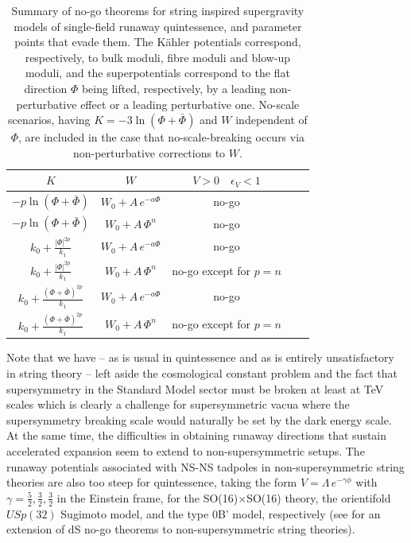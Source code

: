 \begin{table}[ht]
\begin{center}
\centering
\begin{tabular}{| c | c | c | c | c |}
\hline
{\cellcolor[gray]{0.9}$K$} & {\cellcolor[gray]{0.9}$W$} & {\cellcolor[gray]{0.9}$V>0 \quad \epsilon_V<1$} \\
\hline
\hline
$-p\ln(\Phi+\bar{\Phi})$ & $W_0 + A\,e^{-a\Phi}$ & no-go \\
\hline
$-p\ln(\Phi+\bar{\Phi})$ & $W_0 + A\,\Phi^n$ & no-go \\
\hline
$k_0 + \frac{|\Phi|^{2p}}{k_1}$ & $W_0 + A\,e^{-a\Phi}$  & no-go \\
\hline
$k_0 + \frac{|\Phi|^{2p}}{k_1}$ & $W_0 + A\,\Phi^n$ & no-go except for $p=n$ \\
\hline
$k_0 + \frac{(\Phi+\bar{\Phi})^{2p}}{k_1}$ & $W_0 + A\,e^{-a\Phi}$  & no-go \\
\hline
$k_0 + \frac{(\Phi+\bar{\Phi})^{2p}}{k_1}$ & $W_0 + A\,\Phi^n$ & no-go except for $p=n$ \\
\hline
\end{tabular}
\end{center} 
\caption{Summary of no-go theorems for string inspired supergravity models of single-field runaway quintessence, and parameter points that evade them. The K\"ahler potentials correspond, respectively, to bulk moduli, fibre moduli and blow-up moduli, and the superpotentials correspond to the flat direction $\Phi$ being lifted, respectively, by a leading non-perturbative effect or a leading perturbative one.  No-scale scenarios, having $K=-3\ln(\Phi + \bar{\Phi})$ and $W$ independent of $\Phi$, are included in the case that no-scale-breaking occurs via non-perturbative corrections to $W$.}  
\label{quintrunnogos}
\end{table}  

Note that we have -- as is usual in quintessence and as is entirely unsatisfactory in string theory -- left aside the cosmological constant problem and the fact that supersymmetry in the Standard Model sector must be broken at least at TeV scales which is clearly a challenge for supersymmetric vacua where the supersymmetry breaking scale would naturally be set by the dark energy scale.  At the same time, the difficulties in obtaining runaway directions that sustain accelerated expansion seem to extend to non-supersymmetric setups. The runaway potentials 
associated with NS-NS tadpoles in non-supersymmetric string theories are also too steep for quintessence, taking the form $V=\Lambda\, e^{-\gamma \phi}$ with $\gamma=\frac52, \frac32, \frac32$ in the Einstein frame, for the SO(16)$\times$SO(16) theory, the orientifold $USp(32)$ Sugimoto model, and the type 0B' model, respectively (see \cite{Basile:2020mpt} for an extension of dS no-go theorems to non-supersymmetric string theories).

